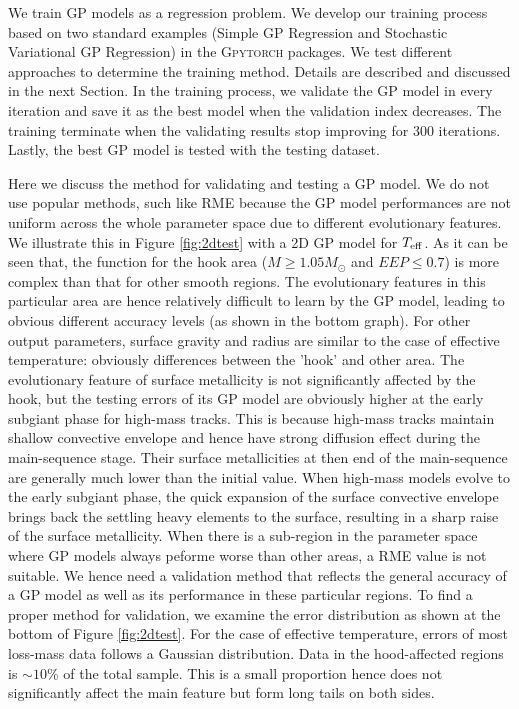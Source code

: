 We train GP models as a regression problem. We develop our training process based on two standard examples (Simple GP Regression and Stochastic Variational GP Regression) in the \textsc{Gpytorch} packages. We test different approaches to determine the training method. Details are described and discussed in the next Section. In the training process, we validate the GP model in every iteration and save it as the best model when the validation index decreases. The training terminate when the validating results stop improving for 300 iterations. Lastly, the best GP model is tested with the testing dataset.

Here we discuss the method for validating and testing a GP model. We do not use popular methods, such like RME because the GP model performances are not uniform across the whole parameter space due to different evolutionary features. We illustrate this in Figure \ref{fig:2dtest} with a 2D GP model for $T_{\rm eff}$. As it can be seen that, the function for the hook area ($M \geq 1.05 M_{\odot}$ and $EEP \leq 0.7$) is more complex than that for other smooth regions. The evolutionary features in this particular area are hence relatively difficult to learn by the GP model, leading to obvious different accuracy levels (as shown in the bottom graph).
%
For other output parameters, surface gravity and radius are similar to the case of effective temperature: obviously differences between the 'hook' and other area. The evolutionary feature of surface metallicity is not significantly affected by the hook, but the testing errors of its GP model are obviously higher at the early subgiant phase for high-mass tracks. This is because high-mass tracks maintain shallow convective envelope and hence have strong diffusion effect during the main-sequence stage.  Their surface metallicities at then end of the main-sequence are generally much lower than the initial value. When high-mass models evolve to the early subgiant phase, the quick expansion of the surface convective envelope brings back the settling heavy elements to the surface, resulting in a sharp raise of the surface metallicity.  When there is a sub-region in the parameter space where GP models always peforme worse than other areas, a RME value is not suitable. We hence need a validation method that reflects the general accuracy of a GP model as well as its performance in these particular regions.   
%
To find a proper method for validation, we examine the error distribution as shown at the bottom of Figure \ref{fig:2dtest}. For the case of effective temperature, errors of most loss-mass data follows a Gaussian distribution. Data in the hood-affected regions is $\sim10\%$ of the total sample. This is a small proportion hence does not significantly affect the main feature but form long tails on both sides.  
